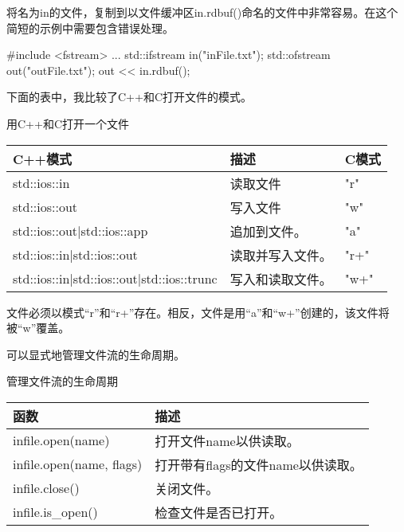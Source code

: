 将名为in的文件，复制到以文件缓冲区in.rdbuf()命名的文件中非常容易。在这个简短的示例中需要包含错误处理。

\begin{cpp}
#include <fstream>
...
std::ifstream in("inFile.txt");
std::ofstream out("outFile.txt");
out << in.rdbuf();
\end{cpp}

下面的表中，我比较了C++和C打开文件的模式。

\begin{center}
用C++和C打开一个文件
\end{center}

\begin{longtable}[c]{|l|l|l|}
\hline
\textbf{C++模式}                          & \textbf{描述}        & \textbf{C模式} \\ \hline
\endfirsthead
%
\endhead
%
std::ios::in                               & 读取文件            & "r"             \\ \hline
std::ios::out                              & 写入文件            & "w"             \\ \hline
std::ios::out|std::ios::app                & 追加到文件。       & "a"             \\ \hline
std::ios::in|std::ios::out                 & 读取并写入文件。 & "r+"            \\ \hline
std::ios::in|std::ios::out|std::ios::trunc &写入和读取文件。 & "w+"            \\ \hline
\end{longtable}

文件必须以模式“r”和“r+”存在。相反，文件是用“a”和“w+”创建的，该文件将被“w”覆盖。

可以显式地管理文件流的生命周期。

\begin{center}
管理文件流的生命周期
\end{center}

\begin{longtable}[c]{|l|l|}
\hline
\textbf{函数}            & \textbf{描述}                                  \\ \hline
\endfirsthead
%
\endhead
%
infile.open(name)        & 打开文件name以供读取。                       \\ \hline
infile.open(name, flags) & 打开带有flags的文件name以供读取。 \\ \hline
infile.close()           & 关闭文件。                                 \\ \hline
infile.is\_open()        & 检查文件是否已打开。                           \\ \hline
\end{longtable}

